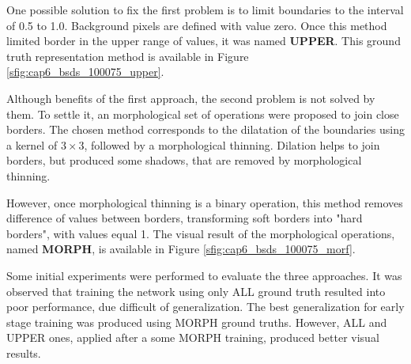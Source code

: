One possible solution to fix the first problem is to limit boundaries to the interval of 0.5 to 1.0.
Background pixels are defined with value zero.
Once this method limited border in the upper range of values, it was named \textbf{UPPER}.
This ground truth representation method is available in Figure \ref{sfig:cap6_bsds_100075_upper}.


Although benefits of the first approach, the second problem is not solved by them.
To settle it, an morphological set of operations were proposed to join close borders.
The chosen method corresponds to the dilatation of the boundaries using a kernel of $3 \times 3$, followed by a morphological thinning.
Dilation helps to join borders, but produced some shadows, that are removed by morphological thinning.

However, once morphological thinning is a binary operation, this method removes difference of values between borders, transforming soft borders into "hard borders", with values equal 1. 
The visual result of the morphological operations, named \textbf{MORPH}, is available in Figure \ref{sfig:cap6_bsds_100075_morf}.


Some initial experiments were performed to evaluate the three approaches.
It was observed that training the network using only ALL ground truth resulted into poor performance, due difficult of generalization.
The best generalization for early stage training was produced using MORPH ground truths.
However, ALL and UPPER ones, applied after a some MORPH training, produced better visual results.

